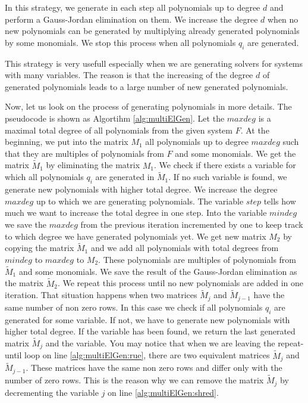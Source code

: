 In this strategy, we generate in each step all polynomials up to degree $d$ and perform a Gauss-Jordan elimination on them. We increase the degree $d$ when no new polynomials can be generated by multiplying already generated polynomials by some monomials. We stop this process when all polynomials $q_i$ are generated. 

This strategy is very usefull especially when we are generating solvers for systems with many variables. The reason is that the increasing of the degree $d$ of generated polynomials leads to a large number of new generated polynomials.

Now, let us look on the process of generating polynomials in more details. The pseudocode is shown as Algortihm \ref{alg:multiElGen}. Let the $maxdeg$ is a maximal total degree of all polynomials from the given system $F$. At the beginning, we put into the matrix $M_1$ all polynomials up to degree $maxdeg$ such that they are multiples of polynomials from $F$ and some monomials. We get the matrix $\tilde{M}_1$ by eliminating the matrix $M_1$. We check if there exists a variable for which all polynomials $q_i$ are generated in $\tilde{M}_1$. If no such variable is found, we generate new polynomials with higher total degree. We increase the degree $maxdeg$ up to which we are generating polynomials. The variable $step$ tells how much we want to increase the total degree in one step. Into the variable $mindeg$ we save the $maxdeg$ from the previous iteration incremented by one to keep track to which degree we have generated polynomials yet. We get new matrix $M_2$ by copying the matrix $\tilde{M}_1$ and we add all polynomials with total degrees from $mindeg$ to $maxdeg$ to $M_2$. These polynomials are multiples of polynomials from $\tilde{M}_1$ and some monomials. We save the result of the Gauss-Jordan elimination as the matrix $\tilde{M}_2$. We repeat this process until no new polynomials are added in one iteration. That situation happens when two matrices $\tilde{M}_j$ and $\tilde{M}_{j-1}$ have the same number of non zero rows. In this case we check if all polynomials $q_i$ are generated for some variable. If not, we have to generate new polynomials with higher total degree. If the variable has been found, we return the last generated matrix $\tilde{M}_j$ and the variable. You may notice that when we are leaving the repeat-until loop on line \ref{alg:multiElGen:rue}, there are two equivalent matrices $\tilde{M}_j$ and $\tilde{M}_{j-1}$. These matrices have the same non zero rows and differ only with the number of zero rows. This is the reason why we can remove the matrix $\tilde{M}_j$ by decrementing the variable $j$ on line \ref{alg:multiElGen:shred}.

